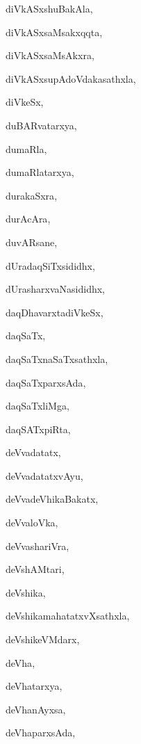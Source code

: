 \begin{multicols}{2}
{diVkASxshuBakAla}, \pageref{diVkASxshuBakAla}

{diVkASxsaMsakxqqta}, \pageref{diVkASxsaMsakxqqta}

{diVkASxsaMsAkxra}, \pageref{diVkASxsaMsAkxra}

{diVkASxsupAdoVdakasathxla}, \pageref{diVkASxsupAdoVdakasathxla}

{diVkeSx}, \pageref{diVkeSx}

{duBARvatarxya}, \pageref{duBARvatarxya}

{dumaRla}, \pageref{dumaRla}

{dumaRlatarxya}, \pageref{dumaRlatarxya}

{durakaSxra}, \pageref{durakaSxra}

{durAcAra}, \pageref{durAcAra}

{duvARsane}, \pageref{duvARsane}

{dUradaqSiTxsididhx}, \pageref{dUradaqSiTxsididhx}

{dUrasharxvaNasididhx}, \pageref{dUrasharxvaNasididhx}

{daqDhavarxtadiVkeSx}, \pageref{daqDhavarxtadiVkeSx}

{daqSaTx}, \pageref{daqSaTx}

{daqSaTxnaSaTxsathxla}, \pageref{daqSaTxnaSaTxsathxla}

{daqSaTxparxsAda}, \pageref{daqSaTxparxsAda}

{daqSaTxliMga}, \pageref{daqSaTxliMga}

{daqSATxpiRta}, \pageref{daqSATxpiRta}

{deVvadatatx}, \pageref{deVvadatatx}

{deVvadatatxvAyu}, \pageref{deVvadatatxvAyu}

{deVvadeVhikaBakatx}, \pageref{deVvadeVhikaBakatx}

{deVvaloVka}, \pageref{deVvaloVka}

{deVvashariVra}, \pageref{deVvashariVra}

{deVshAMtari}, \pageref{deVshAMtari}

{deVshika}, \pageref{deVshika}

{deVshikamahatatxvXsathxla}, \pageref{deVshikamahatatxvXsathxla}

{deVshikeVMdarx}, \pageref{deVshikeVMdarx}

{deVha}, \pageref{deVha}

{deVhatarxya}, \pageref{deVhatarxya}

{deVhanAyxsa}, \pageref{deVhanAyxsa}

{deVhaparxsAda}, \pageref{deVhaparxsAda}


\end{multicols}
